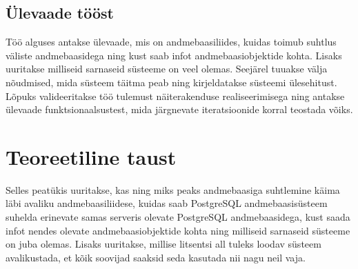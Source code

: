 \documentclass[a4paper,12pt]{article} %
\begin{document}
\subsection{Ülevaade tööst}
Töö alguses antakse ülevaade, mis on andmebaasiliides, kuidas toimub suhtlus väliste andmebaasidega ning kust saab infot andmebaasiobjektide kohta. Lisaks uuritakse milliseid sarnaseid süsteeme on veel olemas. Seejärel tuuakse välja nõudmised, mida süsteem täitma peab ning kirjeldatakse süsteemi ülesehitust. Lõpuks valideeritakse töö tulemust näiterakenduse realiseerimisega ning antakse ülevaade funktsionaalsustest, mida järgnevate iteratsioonide korral teostada võiks.

\section{Teoreetiline taust}
Selles peatükis uuritakse, kas ning miks peaks andmebaasiga suhtlemine käima läbi avaliku andmebaasiliidese, kuidas saab PostgreSQL andmebaasisüsteem suhelda erinevate samas serveris olevate PostgreSQL andmebaasidega, kust saada infot nendes olevate andmebaasiobjektide kohta ning milliseid sarnaseid süsteeme on juba olemas. Lisaks uuritakse, millise litsentsi all tuleks loodav süsteem avalikustada, et kõik soovijad saaksid seda kasutada nii nagu neil vaja.
\end{document}
